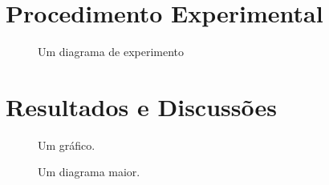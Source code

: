 \documentclass[11pt, twocolumn]{article}
\begin{document}
        \section{Procedimento Experimental}
                \lipsum[5]
                \begin{figure}[!htp]
                        \centering
                        \caption{\small Um diagrama de experimento}
                        \label{DIAGRAMA}
                \end{figure}
                \lipsum[6]

        \section{Resultados e Discussões}
                \lipsum[4]
                \begin{figure}[!htp]
                        \centering
                        \caption{\small Um gráfico.}
                        \label{GRAFICO}
                \end{figure}

                \lipsum[7]

                \begin{figure*}[!htp]
                        \centering
                        \caption{\small Um diagrama maior.}
                        \label{DIAGRAMA_2}
                \end{figure*}

                \lipsum[10]
\end{document}
